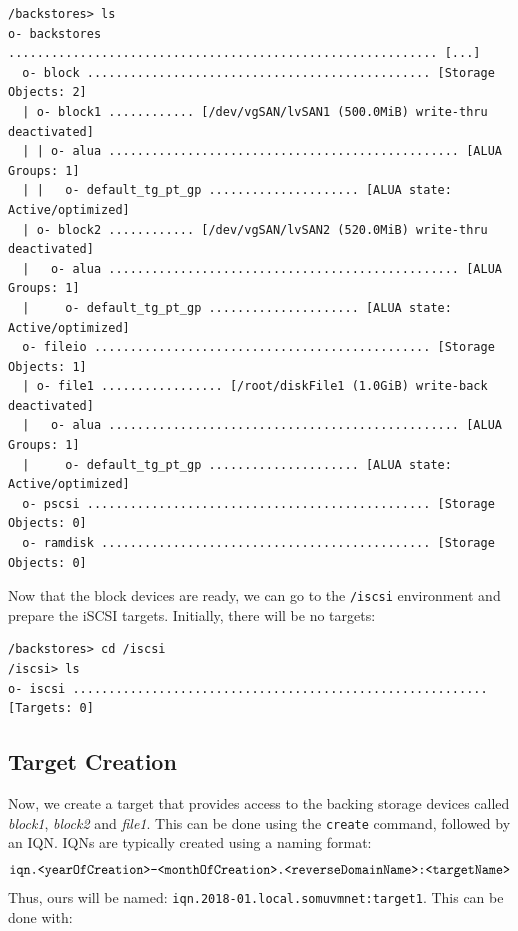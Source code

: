 \vspace{-15pt}
\begin{verbatim}
/backstores> ls
o- backstores ............................................................ [...]
  o- block ................................................ [Storage Objects: 2]
  | o- block1 ............ [/dev/vgSAN/lvSAN1 (500.0MiB) write-thru deactivated]
  | | o- alua ................................................. [ALUA Groups: 1]
  | |   o- default_tg_pt_gp ..................... [ALUA state: Active/optimized]
  | o- block2 ............ [/dev/vgSAN/lvSAN2 (520.0MiB) write-thru deactivated]
  |   o- alua ................................................. [ALUA Groups: 1]
  |     o- default_tg_pt_gp ..................... [ALUA state: Active/optimized]
  o- fileio ............................................... [Storage Objects: 1]
  | o- file1 ................. [/root/diskFile1 (1.0GiB) write-back deactivated]
  |   o- alua ................................................. [ALUA Groups: 1]
  |     o- default_tg_pt_gp ..................... [ALUA state: Active/optimized]
  o- pscsi ................................................ [Storage Objects: 0]
  o- ramdisk .............................................. [Storage Objects: 0]
\end{verbatim}
\vspace{-10pt}

\noindent
Now that the block devices are ready, we can go to the \verb|/iscsi| environment and prepare the iSCSI targets. Initially, there will be no targets:

\vspace{-15pt}
\begin{verbatim}
/backstores> cd /iscsi
/iscsi> ls
o- iscsi .......................................................... [Targets: 0]
\end{verbatim}
\vspace{-10pt}

\subsection{Target Creation}
Now, we create a target that provides access to the backing storage devices called \textit{block1}, \textit{block2} and \textit{file1}. This can be done using the \verb|create| command, followed by an IQN. IQNs are typically created using a naming format: $$\verb|iqn.<yearOfCreation>-<monthOfCreation>.<reverseDomainName>:<targetName>|$$ Thus, ours will be named: \verb|iqn.2018-01.local.somuvmnet:target1|. This can be done with:

